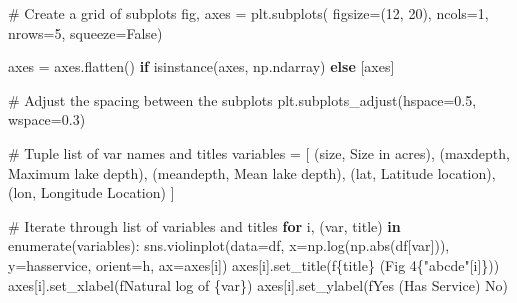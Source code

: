 \documentclass[
]{article}
\newenvironment{Shaded}{\begin{snugshade}}{\end{snugshade}}
\newcommand{\BuiltInTok}[1]{\textcolor[rgb]{0.00,0.23,0.31}{#1}}
\newcommand{\CommentTok}[1]{\textcolor[rgb]{0.37,0.37,0.37}{#1}}
\newcommand{\ControlFlowTok}[1]{\textcolor[rgb]{0.00,0.23,0.31}{\textbf{#1}}}
\newcommand{\DecValTok}[1]{\textcolor[rgb]{0.68,0.00,0.00}{#1}}
\newcommand{\FloatTok}[1]{\textcolor[rgb]{0.68,0.00,0.00}{#1}}
\newcommand{\KeywordTok}[1]{\textcolor[rgb]{0.00,0.23,0.31}{\textbf{#1}}}
\newcommand{\NormalTok}[1]{\textcolor[rgb]{0.00,0.23,0.31}{#1}}
\newcommand{\OperatorTok}[1]{\textcolor[rgb]{0.37,0.37,0.37}{#1}}
\newcommand{\SpecialCharTok}[1]{\textcolor[rgb]{0.37,0.37,0.37}{#1}}
\newcommand{\SpecialStringTok}[1]{\textcolor[rgb]{0.13,0.47,0.30}{#1}}
\newcommand{\StringTok}[1]{\textcolor[rgb]{0.13,0.47,0.30}{#1}}
\newcommand{\VariableTok}[1]{\textcolor[rgb]{0.07,0.07,0.07}{#1}}
\begin{document}
\begin{Shaded}
\begin{Highlighting}[]
\CommentTok{\# Create a grid of subplots}
\NormalTok{fig, axes }\OperatorTok{=}\NormalTok{ plt.subplots(}
\NormalTok{    figsize}\OperatorTok{=}\NormalTok{(}\DecValTok{12}\NormalTok{, }\DecValTok{20}\NormalTok{),}
\NormalTok{    ncols}\OperatorTok{=}\DecValTok{1}\NormalTok{, nrows}\OperatorTok{=}\DecValTok{5}\NormalTok{,}
\NormalTok{    squeeze}\OperatorTok{=}\VariableTok{False}\NormalTok{)}

\NormalTok{axes }\OperatorTok{=}\NormalTok{ axes.flatten() }\ControlFlowTok{if} \BuiltInTok{isinstance}\NormalTok{(axes, np.ndarray) }\ControlFlowTok{else}\NormalTok{ [axes]}

\CommentTok{\# Adjust the spacing between the subplots}
\NormalTok{plt.subplots\_adjust(hspace}\OperatorTok{=}\FloatTok{0.5}\NormalTok{, wspace}\OperatorTok{=}\FloatTok{0.3}\NormalTok{)}

\CommentTok{\# Tuple list of var names and titles}
\NormalTok{variables }\OperatorTok{=}\NormalTok{ [}
\NormalTok{    (}\StringTok{\textquotesingle{}size\textquotesingle{}}\NormalTok{, }\StringTok{\textquotesingle{}Size in acres\textquotesingle{}}\NormalTok{),}
\NormalTok{    (}\StringTok{\textquotesingle{}maxdepth\textquotesingle{}}\NormalTok{, }\StringTok{\textquotesingle{}Maximum lake depth\textquotesingle{}}\NormalTok{),}
\NormalTok{    (}\StringTok{\textquotesingle{}meandepth\textquotesingle{}}\NormalTok{, }\StringTok{\textquotesingle{}Mean lake depth\textquotesingle{}}\NormalTok{),}
\NormalTok{    (}\StringTok{\textquotesingle{}lat\textquotesingle{}}\NormalTok{, }\StringTok{\textquotesingle{}Latitude location\textquotesingle{}}\NormalTok{),}
\NormalTok{    (}\StringTok{\textquotesingle{}lon\textquotesingle{}}\NormalTok{, }\StringTok{\textquotesingle{}Longitude Location\textquotesingle{}}\NormalTok{)}
\NormalTok{]}

\CommentTok{\# Iterate through list of variables and titles}
\ControlFlowTok{for}\NormalTok{ i, (var, title) }\KeywordTok{in} \BuiltInTok{enumerate}\NormalTok{(variables):}
\NormalTok{    sns.violinplot(data}\OperatorTok{=}\NormalTok{df, x}\OperatorTok{=}\NormalTok{np.log(np.}\BuiltInTok{abs}\NormalTok{(df[var])), }
\NormalTok{                   y}\OperatorTok{=}\StringTok{\textquotesingle{}hasservice\textquotesingle{}}\NormalTok{, orient}\OperatorTok{=}\StringTok{\textquotesingle{}h\textquotesingle{}}\NormalTok{, }
\NormalTok{                   ax}\OperatorTok{=}\NormalTok{axes[i])}
\NormalTok{    axes[i].set\_title(}\SpecialStringTok{f\textquotesingle{}}\SpecialCharTok{\{}\NormalTok{title}\SpecialCharTok{\}}\SpecialStringTok{ (Fig 4}\SpecialCharTok{\{}\StringTok{"abcde"}\NormalTok{[i]}\SpecialCharTok{\}}\SpecialStringTok{)\textquotesingle{}}\NormalTok{)}
\NormalTok{    axes[i].set\_xlabel(}\SpecialStringTok{f\textquotesingle{}Natural log of }\SpecialCharTok{\{}\NormalTok{var}\SpecialCharTok{\}}\SpecialStringTok{\textquotesingle{}}\NormalTok{)}
\NormalTok{    axes[i].set\_ylabel(}\SpecialStringTok{f\textquotesingle{}Yes  (Has Service)  No\textquotesingle{}}\NormalTok{)}
\end{Highlighting}
\end{Shaded}
\end{document}

